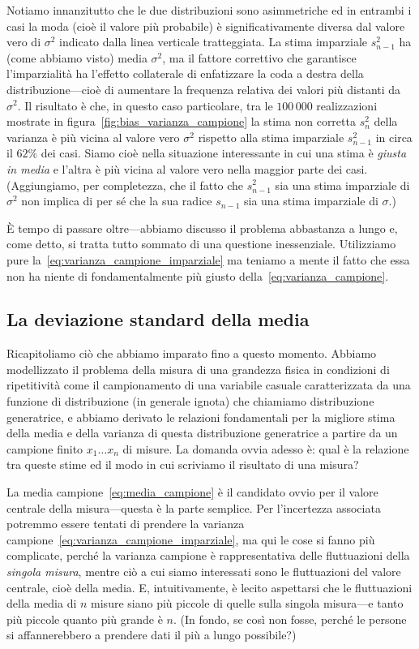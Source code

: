 Notiamo innanzitutto che le due distribuzioni sono asimmetriche ed in entrambi i
casi la moda (cioè il valore più probabile) è significativamente diversa
dal valore vero di $\sigma^2$ indicato dalla linea verticale tratteggiata.
La stima imparziale $s_{n-1}^2$ ha (come abbiamo visto) media $\sigma^2$, ma il
fattore correttivo che garantisce l'imparzialità ha l'effetto collaterale di
enfatizzare la coda a destra della distribuzione---cioè di aumentare la
frequenza relativa dei valori più distanti da $\sigma^2$. Il risultato è
che, in questo caso particolare, tra le $100\,000$ realizzazioni
mostrate in figura~\ref{fig:bias_varianza_campione} la stima non corretta
$s_n^2$ della varianza è più vicina al valore vero $\sigma^2$ rispetto
alla stima imparziale $s_{n-1}^2$ in circa il $62\%$ dei casi. Siamo cioè nella
situazione interessante in cui una stima è \emph{giusta in media} e
l'altra è più vicina al valore vero nella maggior parte dei casi.
(Aggiungiamo, per completezza, che il fatto che $s_{n-1}^2$ sia una stima
imparziale di $\sigma^2$ non implica di per sé che la sua radice $s_{n-1}$ sia
una stima imparziale di $\sigma$.)

\`E tempo di passare oltre---abbiamo discusso il problema abbastanza a lungo e,
come detto, si tratta tutto sommato di una questione inessenziale. Utilizziamo
pure la~\eqref{eq:varianza_campione_imparziale} ma teniamo a mente il fatto
che essa non ha niente di fondamentalmente più giusto
della~\eqref{eq:varianza_campione}.


\subsection{La deviazione standard della media}
\label{sec:deviazione_standard_media}

Ricapitoliamo ciò che abbiamo imparato fino a questo momento. Abbiamo
modellizzato il problema della misura di una grandezza fisica in condizioni di
ripetitività come il campionamento di una variabile casuale caratterizzata da
una funzione di distribuzione (in generale ignota) che chiamiamo distribuzione
generatrice, e abbiamo derivato le relazioni fondamentali per la migliore stima
della media e della varianza di questa distribuzione generatrice a partire da
un campione finito $x_1 \ldots x_n$ di misure. La domanda ovvia adesso è:
qual è la relazione tra queste stime ed il modo in cui scriviamo il risultato
di una misura?

La media campione~\eqref{eq:media_campione} è il candidato ovvio per il
valore centrale della misura---questa è la parte semplice. Per l'incertezza
associata potremmo essere tentati di prendere la varianza
campione~\eqref{eq:varianza_campione_imparziale}, ma qui le cose si fanno più
complicate, perché la varianza campione è rappresentativa delle fluttuazioni
della \emph{singola misura}, mentre ciò a cui siamo interessati sono le
fluttuazioni del valore centrale, cioè della media. E, intuitivamente, è
lecito aspettarsi che le fluttuazioni della media di $n$ misure siano più
piccole di quelle sulla singola misura---e tanto più piccole quanto più
grande è $n$. (In fondo, se così non fosse, perché le persone si
affannerebbero a prendere dati il più a lungo possibile?)

